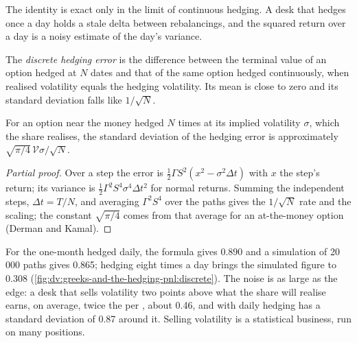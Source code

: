 The identity is exact only in the limit of continuous hedging. A desk that hedges
once a day holds a stale delta between rebalancings, and the squared return over
a day is a noisy estimate of the day's variance.

\begin{definition}\label{def:dv:greeks-and-the-hedging-pnl:dhe}
The \emph{discrete hedging error} is the difference
between the terminal value of an option hedged at $N$ dates and that of the same
option hedged continuously, when realised volatility equals the hedging volatility.
Its mean is close to zero and its standard deviation falls like $1/\sqrt N$.
\end{definition}

\begin{proposition}\label{prop:dv:greeks-and-the-hedging-pnl:dk}
For an option near the money hedged $N$ times at its implied volatility $\sigma$,
which the share realises, the standard deviation of the hedging error is
approximately $\sqrt{\pi/4}\,\mathcal V\sigma/\sqrt N$.
\end{proposition}
\begin{proof}[Partial proof]
Over a step the error is $\tfrac12\Gamma S^2(x^2-\sigma^2\Delta t)$ with $x$ the
step's return; its variance is $\tfrac12\Gamma^2S^4\sigma^4\Delta t^2$ for normal
returns. Summing the independent steps, $\Delta t=T/N$, and averaging
$\Gamma^2S^4$ over the paths gives the $1/\sqrt N$ rate and the  scaling; the
constant $\sqrt{\pi/4}$ comes from that average for an at-the-money option
(Derman and Kamal).
\end{proof}

For the one-month  hedged daily, the formula gives 0.890 and a simulation
of 20\,000 paths gives 0.865; hedging eight times a day brings the simulated
figure to 0.308 (\cref{fig:dv:greeks-and-the-hedging-pnl:discrete}). The noise is
as large as the edge: a desk that sells volatility two points above what the
share will realise earns, on average, twice the  per , about 0.46, and
with daily hedging has a standard deviation of 0.87 around it. Selling volatility
is a statistical business, run on many positions.

